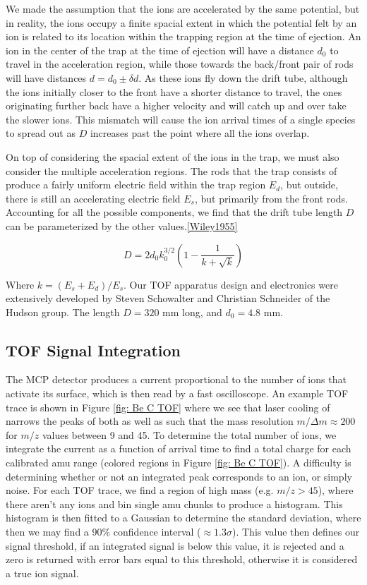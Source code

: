 We made the assumption that the ions are accelerated by the same potential, but in reality, the ions occupy a finite spacial extent in which the potential felt by an ion is related to its location within the trapping region at the time of ejection. An ion in the center of the trap at the time of ejection will have a distance $d_0$ to travel in the acceleration region, while those towards the back/front pair of rods will have distances $d=d_0\pm \delta d$. As these ions fly down the drift tube, although the ions initially closer to the front have a shorter distance to travel, the ones originating further back have a higher velocity and will catch up and over take the slower ions. This mismatch will cause the ion arrival times of a single species to spread out as $D$ increases past the point where all the ions overlap.

On top of considering the spacial extent of the ions in the trap, we must also consider the multiple acceleration regions. The rods that the trap consists of produce a fairly uniform electric field within the trap region $E_d$, but outside, there is still an accelerating electric field $E_s$, but primarily from the front rods. Accounting for all the possible components, we find that the drift tube length $D$ can be parameterized by the other values.\ref{Wiley1955}

\begin{equation}
	D = 2d_0 k_0^{3/2}\left(1-\frac{1}{k+\sqrt{k}}\right)
\end{equation}

Where $k = (E_s + E_d)/E_s$. Our TOF apparatus design and electronics were extensively developed by Steven Schowalter and Christian Schneider of the Hudson group.\cite{Schowalter2012,Schneider2014} The length $D=320$ mm long, and $d_0=4.8$ mm.

\subsection{TOF Signal Integration}

The MCP detector produces a current proportional to the number of ions that activate its surface, which is then read by a fast oscilloscope. An example TOF trace is shown in Figure \ref{fig: Be C TOF} where we see that laser cooling of  narrows the peaks of both  as well as  such that the mass resolution $m/\Delta m \approx 200$ for $m/z$ values between 9 and 45. To determine the total number of ions, we integrate the current as a function of arrival time to find a total charge for each calibrated amu range (colored regions in Figure \ref{fig: Be C TOF}). A difficulty is determining whether or not an integrated peak corresponds to an ion, or simply noise. For each TOF trace, we find a region of high mass (e.g. $m/z > 45$), where there aren't any ions and bin single amu chunks to produce a histogram. This histogram is then fitted to a Gaussian to determine the standard deviation, where then we may find a 90\% confidence interval ($\approx 1.3 \sigma$). This value then defines our signal threshold, if an integrated signal is below this value, it is rejected and a zero is returned with error bars equal to this threshold, otherwise it is considered a true ion signal.
